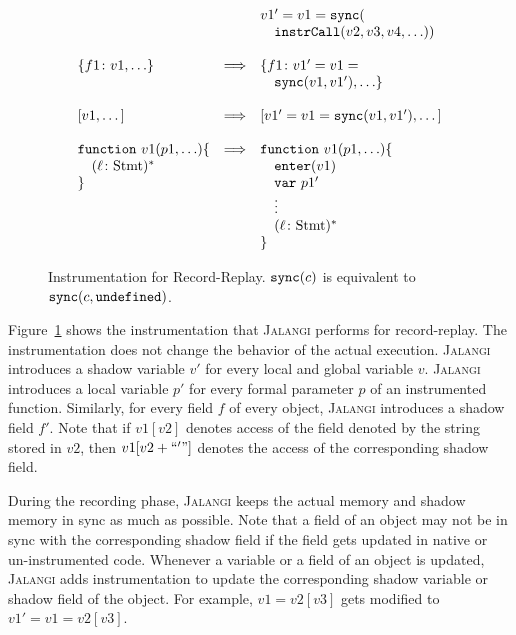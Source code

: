 \documentclass{sig-alternate}
\def\jalangi{\textsc{Jalangi}}
\newcommand \dsl [1] {\ensuremath{{\tt #1}}\xspace}
\newcommand \Sync{\dsl{sync}}
\newcommand \Enter{\dsl{enter}}
\begin{document}
\begin{figure}
{\[\begin{array}{lrl}
& & v1' = v1 = \Sync(\\
& & \quad\dsl{instrCall}(v2, v3, v4, \ldots))\\
& & \\
  \{f1\colon v1, \ldots\} & \Longrightarrow &\{f1\colon v1' = v1 =\\
& &\quad  \Sync(v1, v1'), \ldots\} \\
& & \\
  \mbox{[}v1, \ldots\mbox{]} & \Longrightarrow & \mbox{[}v1' = v1 =
  \Sync(v1, v1'), \ldots\mbox{]} \\
& & \\
    \dsl{function}\ v1(p1, \ldots) \{ & \Longrightarrow &  \dsl{function}\ v1 (p1, \ldots) \{\\
\quad (\ell\colon \mbox{Stmt})^* & & \quad \Enter(v1)\\
\} & & \quad \dsl{var}\ p1'\\
& & \quad \vdots\\
& & \quad  (\ell\colon \mbox{Stmt})^*\\
& & \}\\
\end{array}
\]}
\caption{Instrumentation for Record-Replay. $\Sync(c)$ is
  equivalent to $\Sync(c, \dsl{undefined})$.}
\label{fig:instr2}
\end{figure}
 
Figure~\ref{fig:instr2} shows the instrumentation that \jalangi{}
performs for record-replay.  The instrumentation does not change the
behavior of the actual execution. \jalangi{} introduces a shadow
variable $v'$ for every local and global variable $v$.  \jalangi{}
introduces a local variable $p'$ for every formal parameter $p$ of an
instrumented function.  Similarly, for every field $f$ of every
object, \jalangi{} introduces a shadow field $f'$.  Note that if
$v1[v2]$ denotes access of the field denoted by the string stored in
$v2$, then $v1[v2+``'"]$ denotes the access of the corresponding
shadow field.

During the recording phase, \jalangi{} keeps the actual memory and
shadow memory in sync as much as possible.  Note that a field of an
object may not be in sync with the corresponding shadow field if the
field gets updated in native or un-instrumented code.  Whenever a
variable or a field of an object is updated, \jalangi{} adds
instrumentation to update the corresponding shadow variable or shadow
field of the object.  For example, $v1 = v2[v3]$ gets modified to $v1'
= v1 = v2[v3]$.
\end{document}
